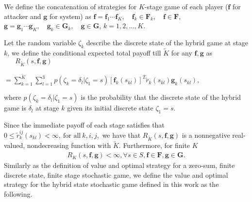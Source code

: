 We define the concatenation of strategies for $K$-stage game of each player ($\mathbf{f}$ for attacker and $\mathbf{g}$ for system) as $\mathbf{f}=\mathbf{f}_1\cdots \mathbf{f}_K,\quad\mathbf{f}_{k} \in \mathbf{F}_{k},\quad\mathbf{f}\in \mathbf{F},$
$\mathbf{g}=\mathbf{g}_{1}\cdots\mathbf{g}_K,\quad\mathbf{g}_{k} \in \mathbf{G}_{k},\quad\mathbf{g}\in\mathbf{G}$,
$k=1, 2,\dots,K$.
\begin{defn}
Let the random variable $\zeta_{k}$ describe the discrete state of the hybrid game at stage $k$, we define the conditional expected total payoff till $\tilde{K}$ for any $\mathbf{f},\mathbf{g}$ as%
\\$\text{ }\quad R_{\tilde{K}}(s, \mathbf{f}, \mathbf{g})$
\\\centerline{$
=\sum \limits^{\tilde{K}}_{k=1}\sum_{l=1}^{3} p(\zeta_{k}=\delta_{l}|\zeta_{1} = s)[\mathbf{f}_{k}(s_{kl})]^{T}\tilde{r}_{k}(s_{kl})\mathbf{g}_{k}(s_{kl}),
$}
where $p(\zeta_{k}=\delta_{l}|\zeta_{1} = s)$ is the probability that the discrete state of the hybrid game is $\delta_{l}$ at stage $k$ given its initial discrete state $\zeta_{1}=s$.
\label{R_K}
\end{defn}
Since the immediate payoff of each stage satisfies that $0 \leq \tilde{r}_{k}^{ij}(s_{kl})< \infty,\ \text{for all}\ k,i,j,$
we have that $R_{\tilde{K}}(s, \mathbf{f}, \mathbf{g})$ is a nonnegative real-valued, nondecreasing function with $\tilde{K}$. 
Furthermore, for finite $K$%
\begin{align}
R_{K}(s,\mathbf{f}, \mathbf{g}) < \infty, \forall s \in S, \mathbf{f}\in \mathbf{F}, \mathbf{g} \in \mathbf{G}.
\label{fR}
\end{align}
Similarly as the definition of value and optimal strategy for a zero-sum, finite discrete state, finite stage stochastic game, we define the value and optimal strategy for the hybrid state stochastic game defined in this work as the following.
